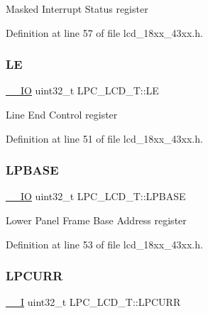 Masked Interrupt Status register 

Definition at line 57 of file lcd\+\_\+18xx\+\_\+43xx.\+h.

\mbox{\label{struct_l_p_c___l_c_d___t_a5aac26c848401f1f369d7bf65c428036}} 
\subsubsection{\texorpdfstring{LE}{LE}}
{\footnotesize\ttfamily \hyperlink{core__sc300_8h_aec43007d9998a0a0e01faede4133d6be}{\+\_\+\+\_\+\+IO} uint32\+\_\+t L\+P\+C\+\_\+\+L\+C\+D\+\_\+\+T\+::\+LE}

Line End Control register 

Definition at line 51 of file lcd\+\_\+18xx\+\_\+43xx.\+h.

\mbox{\label{struct_l_p_c___l_c_d___t_ac954f35c70357ceaa2642b359858852d}} 
\subsubsection{\texorpdfstring{L\+P\+B\+A\+SE}{LPBASE}}
{\footnotesize\ttfamily \hyperlink{core__sc300_8h_aec43007d9998a0a0e01faede4133d6be}{\+\_\+\+\_\+\+IO} uint32\+\_\+t L\+P\+C\+\_\+\+L\+C\+D\+\_\+\+T\+::\+L\+P\+B\+A\+SE}

Lower Panel Frame Base Address register 

Definition at line 53 of file lcd\+\_\+18xx\+\_\+43xx.\+h.

\mbox{\label{struct_l_p_c___l_c_d___t_a1daeb30c72db80cd8dfcbbe1c60a6c2e}} 
\subsubsection{\texorpdfstring{L\+P\+C\+U\+RR}{LPCURR}}
{\footnotesize\ttfamily \hyperlink{core__sc300_8h_af63697ed9952cc71e1225efe205f6cd3}{\+\_\+\+\_\+I} uint32\+\_\+t L\+P\+C\+\_\+\+L\+C\+D\+\_\+\+T\+::\+L\+P\+C\+U\+RR}

